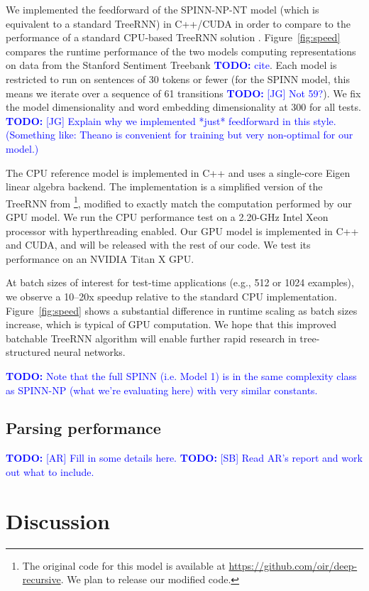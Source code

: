\documentclass[11pt]{article}
\newcommand\todo[1]{\textcolor{blue}{\textbf{TODO:} #1}}
\begin{document}
We implemented the feedforward of the SPINN-NP-NT model (which is equivalent to a standard TreeRNN) in C++/CUDA in order to compare to the performance of a standard CPU-based TreeRNN solution \cite{irsoy2014deep}. Figure~\ref{fig:speed} compares the runtime performance of the two models computing representations on data from the Stanford Sentiment Treebank \todo{cite}. Each model is restricted to run on sentences of 30 tokens or fewer (for the SPINN model, this means we iterate over a sequence of 61 transitions \todo{[JG] Not 59?}). We fix the model dimensionality and word embedding dimensionality at 300 for all tests. \todo{[JG] Explain why we implemented *just* feedforward in this style. (Something like: Theano is convenient for training but very non-optimal for our model.)}

The CPU reference model is implemented in C++ and uses a single-core Eigen linear algebra backend. The implementation is a simplified version of the TreeRNN from \citealt{irsoy2014deep}\footnote{The original code for this model is available at \url{https://github.com/oir/deep-recursive}. We plan to release our modified code.}, modified to exactly match the computation performed by our GPU model. We run the CPU performance test on a 2.20-GHz Intel Xeon processor with hyperthreading enabled. Our GPU model is implemented in C++ and CUDA, and will be released with the rest of our code. We test its performance on an NVIDIA Titan X GPU.

At batch sizes of interest for test-time applications (e.g., 512 or 1024 examples), we observe a 10--20x speedup relative to the standard CPU implementation. Figure~\ref{fig:speed} shows a substantial difference in runtime scaling as batch sizes increase, which is typical of GPU computation. We hope that this improved batchable TreeRNN algorithm will enable further rapid research in tree-structured neural networks.

\todo{Note that the full SPINN (i.e. Model 1) is in the same complexity class as SPINN-NP (what we're evaluating here) with very similar constants.}

\subsection{Parsing performance}

\todo{[AR] Fill in some details here.}
\todo{[SB] Read AR's report and work out what to include.}

\section{Discussion}
\end{document}
